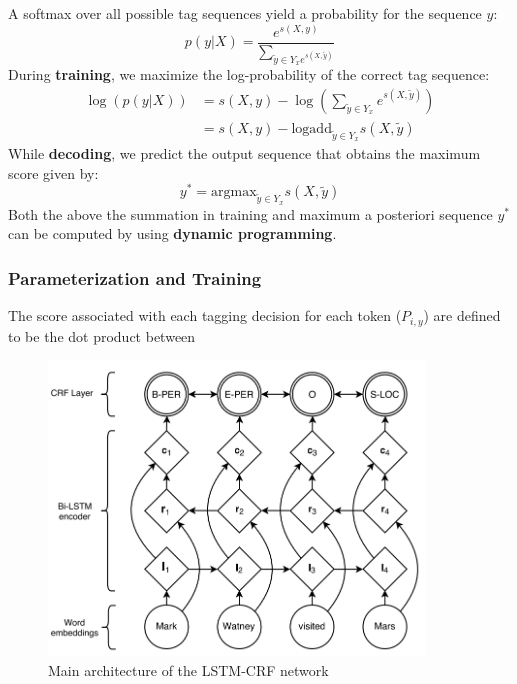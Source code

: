 \documentclass[a3paper, 12pt]{book} %
\begin{document}
A softmax over all possible tag sequences yield a probability for the sequence $y$:
\begin{equation}
p(y|X)=\frac{e^{s(X,y)}}{\sum_{\tilde{y} \in Y_x {e^{s(X,\tilde{y})}}}}
\end{equation}
During \textbf{training}, we maximize the log-probability of the correct tag sequence:
\begin{equation}
\begin{split}
\log{(p(y|X))} & = s(X,y) - \log{(\sum_{\tilde{y} \in Y_x} {e^{s(X,\tilde{y})}})} \\
& = s(X,y) - \mathrm{logadd}_{\tilde{y} \in Y_x} {s(X,\tilde{y})}
\end{split}
\end{equation}
While \textbf{decoding}, we predict the output sequence that obtains the maximum score given by:
\begin{equation}
y^*=\mathrm{argmax}_{\tilde{y} \in Y_x}{s(X,\tilde{y})}
\end{equation}
Both the above the summation in training and maximum a posteriori sequence $y^*$ can be computed by using \textbf{dynamic programming}.

\subsubsection{Parameterization and Training}
The score associated with each tagging decision for each token ($P_{i,y}$) are defined to be the dot product between 

\begin{figure}[htpb]
	\centering
	\includegraphics[width=10cm]{figures/lstm_crf.png}
	\caption{Main architecture of the LSTM-CRF network}
	\label{fig:boat1}
\end{figure}
\end{document}
